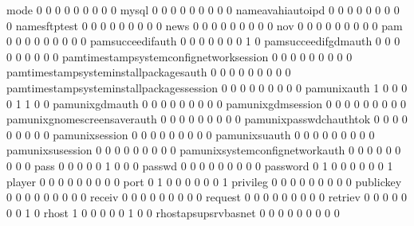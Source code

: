\documentclass[compress,8pt]{beamer}
\begin{document}
\begin{frame}
\begin{Schunk}
  mode                                       0   0   0   0   0   0   0   0   0
  mysql                                      0   0   0   0   0   0   0   0   0
  nameavahiautoipd                           0   0   0   0   0   0   0   0   0
  namesftptest                               0   0   0   0   0   0   0   0   0
  news                                       0   0   0   0   0   0   0   0   0
  nov                                        0   0   0   0   0   0   0   0   0
  pam                                        0   0   0   0   0   0   0   0   0
  pamsucceedifauth                           0   0   0   0   0   0   0   1   0
  pamsucceedifgdmauth                        0   0   0   0   0   0   0   0   0
  pamtimestampsystemconfignetworksession     0   0   0   0   0   0   0   0   0
  pamtimestampsysteminstallpackagesauth      0   0   0   0   0   0   0   0   0
  pamtimestampsysteminstallpackagessession   0   0   0   0   0   0   0   0   0
  pamunixauth                                1   0   0   0   0   1   1   0   0
  pamunixgdmauth                             0   0   0   0   0   0   0   0   0
  pamunixgdmsession                          0   0   0   0   0   0   0   0   0
  pamunixgnomescreensaverauth                0   0   0   0   0   0   0   0   0
  pamunixpasswdchauthtok                     0   0   0   0   0   0   0   0   0
  pamunixsession                             0   0   0   0   0   0   0   0   0
  pamunixsuauth                              0   0   0   0   0   0   0   0   0
  pamunixsusession                           0   0   0   0   0   0   0   0   0
  pamunixsystemconfignetworkauth             0   0   0   0   0   0   0   0   0
  pass                                       0   0   0   0   0   1   0   0   0
  passwd                                     0   0   0   0   0   0   0   0   0
  password                                   0   1   0   0   0   0   0   0   1
  player                                     0   0   0   0   0   0   0   0   0
  port                                       0   1   0   0   0   0   0   0   1
  privileg                                   0   0   0   0   0   0   0   0   0
  publickey                                  0   0   0   0   0   0   0   0   0
  receiv                                     0   0   0   0   0   0   0   0   0
  request                                    0   0   0   0   0   0   0   0   0
  retriev                                    0   0   0   0   0   0   0   1   0
  rhost                                      1   0   0   0   0   0   1   0   0
  rhostapsupsrvbasnet                        0   0   0   0   0   0   0   0   0

\end{Schunk}
\end{frame}
\end{document}
